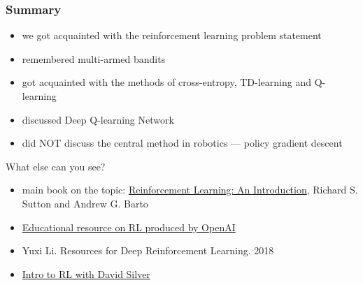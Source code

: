 \documentclass[fullscreen=true, bookmarks=true, hyperref={pdfencoding=unicode}]{beamer}
\begin{document}
\begin{frame}[t]
\frametitle{Summary}

  \begin{itemize}
    \item we got acquainted with the reinforcement learning problem statement
    \item remembered multi-armed bandits
    \item got acquainted with the methods of cross-entropy, TD-learning and Q-learning
    \item discussed Deep Q-learning Network
    \item did NOT discuss the central method in robotics — policy gradient descent
  \end{itemize}
  \vspace{0.5cm}
  \pause
  What else can you see?

  \begin{itemize}
    \item main book on the topic: \href{https://web.stanford.edu/class/psych209/Readings/SuttonBartoIPRLBook2ndEd.pdf}{Reinforcement Learning: An Introduction}, Richard S. Sutton and Andrew G. Barto
    \item \href{https://spinningup.openai.com/en/latest}{Educational resource on RL produced by OpenAI}
    \item Yuxi Li. Resources for Deep Reinforcement Learning. 2018
    \item \href{https://www.deepmind.com/learning-resources/introduction-to-reinforcement-learning-with-david-silver}{Intro to RL with David Silver}
  \end{itemize}
\end{frame}
\end{document}

